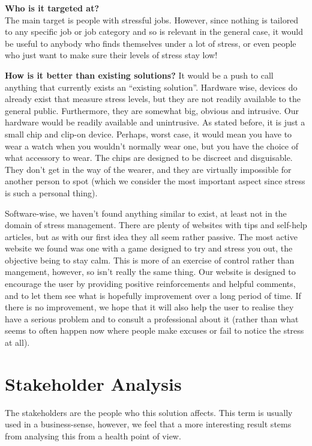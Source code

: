 \documentclass{scrartcl}
\begin{document}
\textbf{Who is it targeted at?}\\
The main target is people with stressful jobs. However, since nothing is tailored to any specific job or job category and so
is relevant in the general case, it would be useful to anybody who finds themselves under a lot of stress, or even people
who just want to make sure their levels of stress stay low!

\textbf{How is it better than existing solutions?}
It would be a push to call anything that currently exists an ``existing solution''. Hardware wise, devices do already exist that
measure stress levels, but they are not readily available to the general public. Furthermore, they are somewhat big, obvious and
intrusive. Our hardware would be readily available and unintrusive. As stated before, it is just a small chip and clip-on device.
Perhaps, worst case, it would mean you have to wear a watch when you wouldn't normally wear one, but you have the choice of what
accessory to wear. The chips are designed to be discreet and disguisable. They don't get in the way of the wearer, and they are
virtually impossible for another person to spot (which we consider the most important aspect since stress is such a personal
thing).

Software-wise, we haven't found anything similar to exist, at least not in the domain of stress management. There are plenty of
websites with tips and self-help articles, but as with our first idea they all seem rather passive. The most active website we
found was one with a game designed to try and stress you out, the objective being to stay calm. This is more of an exercise of
control rather than mangement, however, so isn't really the same thing. Our website is designed to encourage the user by 
providing positive reinforcements and helpful comments, and to let them see what is hopefully improvement over a long period of time.
If there is no improvement, we hope that it will also help the user to realise they have a serious problem and to consult a
professional about it (rather than what seems to often happen now where people make excuses or fail to notice the stress at all).

\section{Stakeholder Analysis}
The stakeholders are the people who this solution affects. This term is usually used in a business-sense, however, we feel that
a more interesting result stems from analysing this from a health point of view.
\end{document}
